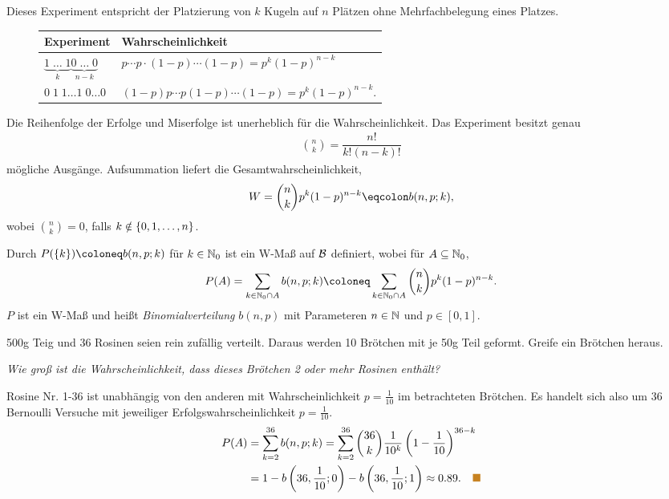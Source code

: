 Dieses Experiment entspricht der Platzierung von $k$ Kugeln auf $n$ Plätzen ohne
Mehrfachbelegung eines Platzes.
\begin{figure}[H]
\begin{tabular}{l|l}
\textbf{Experiment} & \textbf{Wahrscheinlichkeit}\\\hline
$\underbrace{1\; \ldots\; 1}_{k} \underbrace{0\;\ldots\; 0}_{n-k}$ & 
$p\cdots p \cdot (1-p)\cdots (1-p) = p^k(1-p)^{n-k}$\\
$0\; 1\; 1 \ldots 1\; 0 \ldots 0$ & 
$(1-p)p\cdots p(1-p)\cdots (1-p) = p^k(1-p)^{n-k}$.
\end{tabular}
\end{figure}
Die Reihenfolge der Erfolge und Miserfolge ist unerheblich für die
Wahrscheinlichkeit. Das Experiment besitzt genau
\begin{align*}
\binom{n}{k} = \dfrac{n!}{k!(n-k)!}
\end{align*}
mögliche Ausgänge. Aufsummation liefert die Gesamtwahrscheinlichkeit,
\begin{align*}
W = \binom{n}{k} p^k(1-p)^{n-k} \defr b(n,p;k),
\end{align*}
wobei $\binom{n}{k} = 0$, falls
$k\notin\left\{ 0,1,\ldots,n \right\}$.
\begin{defnn}
Durch $P(\setd{k}) \defl b(n,p;k)$ für $k\in\mathbb{N}_0$ ist ein W-Maß auf $\mathcal{B}$
definiert, wobei für $A\subseteq \mathbb{N}_0$,
\begin{align*}
P(A) = \sum\limits_{k\in\N_0\cap A} b(n,p;k) \defl \sum\limits_{k\in\N_0\cap A}
\binom{n}{k} p^k(1-p)^{n-k}.
\end{align*}
$P$ ist ein W-Maß und heißt \emph{Binomialverteilung} $b(n,p)$ mit Parameteren
$n\in\mathbb{N}$ und $p\in[0,1]$.\fishhere
\end{defnn}

\begin{bsp}
\label{bsp:1.2}
500g Teig und 36 Rosinen seien rein zufällig verteilt. Daraus
werden 10 Brötchen mit je 50g Teil geformt. Greife ein Brötchen heraus.

\textit{Wie groß ist die Wahrscheinlichkeit, dass dieses
Brötchen 2 oder mehr Rosinen enthält?}

Rosine Nr. 1-36 ist unabhängig von den anderen mit Wahrscheinlichkeit
$p=\frac{1}{10}$ im betrachteten Brötchen. Es handelt sich also um 36
Bernoulli Versuche mit jeweiliger Erfolgswahrscheinlichkeit $p=\frac{1}{10}$. 
\begin{align*}
P(A) &= \sum\limits_{k=2}^{36} b(n,p;k) = \sum\limits_{k=2}^{36}
\binom{36}{k}\frac{1}{10^k}\left(1-\frac{1}{10}\right)^{36-k} \\
&=1-b\left(36,\frac{1}{10};0\right) - b\left(36,\frac{1}{10};1\right) \approx
0.89.\bsphere
\end{align*}
\end{bsp}

